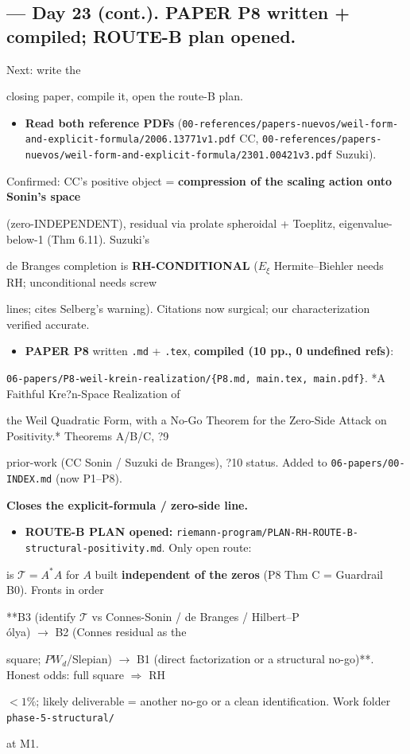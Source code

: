 \documentclass[10pt]{article}
\begin{document}
\subsection*{ --- Day 23 (cont.). PAPER P8 written + compiled; ROUTE-B plan opened.}
Next: write the\par
closing paper, compile it, open the route-B plan.\par
\begin{itemize}
\item \textbf{Read both reference PDFs} (\texttt{00-references/papers-nuevos/weil-form-and-explicit-formula/2006.13771v1.pdf} CC, \texttt{00-references/papers-nuevos/weil-form-and-explicit-formula/2301.00421v3.pdf} Suzuki).
\end{itemize}
  Confirmed: CC's positive object = \textbf{compression of the scaling action onto Sonin's space}\par
  (zero-INDEPENDENT), residual via prolate spheroidal + Toeplitz, eigenvalue-below-1 (Thm 6.11). Suzuki's\par
  de Branges completion is \textbf{RH-CONDITIONAL} ($E_\xi$ Hermite--Biehler needs RH; unconditional needs screw\par
  lines; cites Selberg's warning). Citations now surgical; our characterization verified accurate.\par
\begin{itemize}
\item \textbf{PAPER P8} written \texttt{.md} + \texttt{.tex}, \textbf{compiled (10 pp., 0 undefined refs)}:
\end{itemize}
  \texttt{06-papers/P8-weil-krein-realization/\{P8.md, main.tex, main.pdf\}}. *A Faithful Kre?n-Space Realization of\par
  the Weil Quadratic Form, with a No-Go Theorem for the Zero-Side Attack on Positivity.* Theorems A/B/C, ?9\par
  prior-work (CC Sonin / Suzuki de Branges), ?10 status. Added to \texttt{06-papers/00-INDEX.md} (now P1--P8).\par
  \textbf{Closes the explicit-formula / zero-side line.}\par
\begin{itemize}
\item \textbf{ROUTE-B PLAN opened:} \texttt{riemann-program/PLAN-RH-ROUTE-B-structural-positivity.md}. Only open route:
\end{itemize}
  is $\mathcal T=A^*A$ for $A$ built \textbf{independent of the zeros} (P8 Thm C = Guardrail B0). Fronts in order\par
  **B3 (identify $\mathcal T$ vs Connes-Sonin / de Branges / Hilbert--P\\\'olya) \ensuremath{\to} B2 (Connes residual as the\par
  square; $PW_d$/Slepian) \ensuremath{\to} B1 (direct factorization or a structural no-go)**. Honest odds: full square \ensuremath{\Rightarrow} RH\par
  $<1\%$; likely deliverable = another no-go or a clean identification. Work folder \texttt{phase-5-structural/}\par
  at M1.\par
\end{document}
